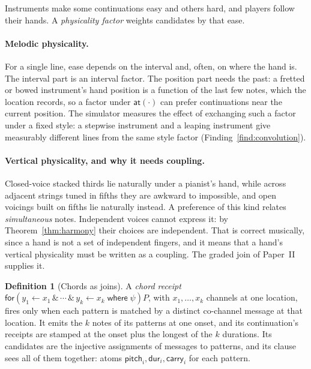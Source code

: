 \documentclass[11pt,a4paper]{article}
\theoremstyle{plain}
\theoremstyle{definition}
\newtheorem{definition}[theorem]{Definition}
\theoremstyle{remark}
\newcommand{\atm}[1]{\mathsf{#1}}
\begin{document}
Instruments make some continuations easy and others hard, and players follow
their hands. A \emph{physicality factor} weights candidates by that ease.

\paragraph{Melodic physicality.} For a single line, ease depends on the interval
and, often, on where the hand is. The interval part is an interval factor. The
position part needs the past: a fretted or bowed instrument's hand position is
a function of the last few notes, which the location records, so a factor under
$\atm{at}(\cdot)$ can prefer continuations near the current position. The
simulator measures the effect of exchanging such a factor under a fixed style:
a stepwise instrument and a leaping instrument give measurably different lines
from the same style factor (Finding~\ref{find:convolution}).

\paragraph{Vertical physicality, and why it needs coupling.} Closed-voice
stacked thirds lie naturally under a pianist's hand, while across adjacent
strings tuned in fifths they are awkward to impossible, and open voicings built
on fifths lie naturally instead. A preference of this kind relates
\emph{simultaneous} notes. Independent voices cannot express it: by
Theorem~\ref{thm:harmony} their choices are independent. That is correct
musically, since a hand is not a set of independent fingers, and it means that a
hand's vertical physicality must be written as a coupling. The graded join of
Paper~II supplies it.

\begin{definition}[Chords as joins]\label{def:join}
A \emph{chord receipt}
$\mathsf{for}(y_1 \leftarrow x_1 \,\&\, \cdots \,\&\, y_k \leftarrow x_k
\;\mathsf{where}\;\psi)P$, with $x_1,\dots,x_k$ channels at one location,
fires only when each pattern is matched by a distinct co-channel message at that
location. It emits the $k$ notes of its patterns at one onset, and its
continuation's receipts are stamped at the onset plus the longest of the $k$
durations. Its candidates are the injective assignments of messages to
patterns, and its clause sees all of them together: atoms
$\atm{pitch}_i, \atm{dur}_i, \atm{carry}_i$ for each pattern.
\end{definition}
\end{document}
